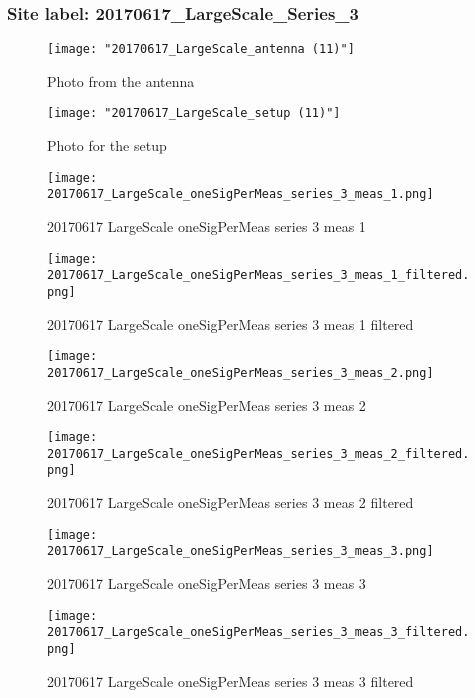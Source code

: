 \subsubsection{Site label: 20170617\_LargeScale\_Series\_3}
\begin{figure}[ht] \caption{Photo from the antenna}
\texttt{[image: "20170617\_LargeScale\_antenna (11)"]}\centering\end{figure}
\begin{figure}[ht] \caption{Photo for the setup}
\texttt{[image: "20170617\_LargeScale\_setup (11)"]}\centering\end{figure}
\begin{figure}[ht] \caption{20170617 LargeScale oneSigPerMeas series 3 meas 1}
\texttt{[image: 20170617\_LargeScale\_oneSigPerMeas\_series\_3\_meas\_1.png]}\centering\end{figure}
\begin{figure}[ht] \caption{20170617 LargeScale oneSigPerMeas series 3 meas 1 filtered}
\texttt{[image: 20170617\_LargeScale\_oneSigPerMeas\_series\_3\_meas\_1\_filtered.png]}\centering\end{figure}
\begin{figure}[ht] \caption{20170617 LargeScale oneSigPerMeas series 3 meas 2}
\texttt{[image: 20170617\_LargeScale\_oneSigPerMeas\_series\_3\_meas\_2.png]}\centering\end{figure}
\begin{figure}[ht] \caption{20170617 LargeScale oneSigPerMeas series 3 meas 2 filtered}
\texttt{[image: 20170617\_LargeScale\_oneSigPerMeas\_series\_3\_meas\_2\_filtered.png]}\centering\end{figure}
\begin{figure}[ht] \caption{20170617 LargeScale oneSigPerMeas series 3 meas 3}
\texttt{[image: 20170617\_LargeScale\_oneSigPerMeas\_series\_3\_meas\_3.png]}\centering\end{figure}
\begin{figure}[ht] \caption{20170617 LargeScale oneSigPerMeas series 3 meas 3 filtered}
\texttt{[image: 20170617\_LargeScale\_oneSigPerMeas\_series\_3\_meas\_3\_filtered.png]}\centering\end{figure}
\clearpage
